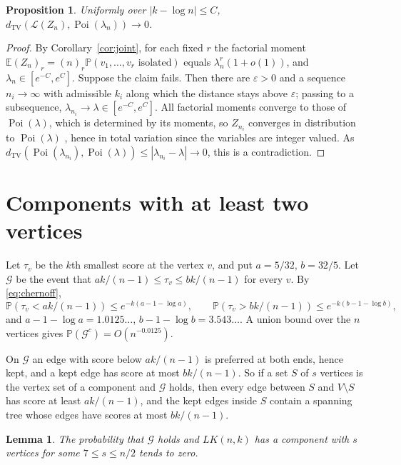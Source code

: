 \documentclass[11pt]{amsart}
\newtheorem{lemma}[theorem]{Lemma}
\newtheorem{proposition}[theorem]{Proposition}
\theoremstyle{remark}
\numberwithin{equation}{section}
\newcommand{\E}{\mathbb E}
\newcommand{\Pp}{\mathbb P}
\newcommand{\Poi}{\operatorname{Poi}}
\newcommand{\dtv}{d_{\mathrm{TV}}}
\newcommand{\1}{\mathbf 1}
\begin{document}
\begin{proposition}\label{prop:poisson}
Uniformly over $|k-\log n|\le C$, $\dtv(\mathcal L(Z_n),\Poi(\lambda_n))\to0$.
\end{proposition}

\begin{proof}
By Corollary~\ref{cor:joint}, for each fixed $r$ the factorial moment $\E(Z_n)_r=(n)_r\Pp(v_1,\dots,v_r\text{ isolated})$ equals $\lambda_n^r(1+o(1))$, and $\lambda_n\in[e^{-C},e^C]$. Suppose the claim fails. Then there are $\varepsilon>0$ and a sequence $n_i\to\infty$ with admissible $k_i$ along which the distance stays above $\varepsilon$; passing to a subsequence, $\lambda_{n_i}\to\lambda\in[e^{-C},e^C]$. All factorial moments converge to those of $\Poi(\lambda)$, which is determined by its moments, so $Z_{n_i}$ converges in distribution to $\Poi(\lambda)$ \cite[Theorem~30.2]{Bil}, hence in total variation since the variables are integer valued. As $\dtv(\Poi(\lambda_{n_i}),\Poi(\lambda))\le|\lambda_{n_i}-\lambda|\to0$, this is a contradiction.
\end{proof}

\section{Components with at least two vertices}\label{sec:comp}

Let $\tau_v$ be the $k$th smallest score at the vertex $v$, and put $a=5/32$, $b=32/5$. Let $\mathcal G$ be the event that $ak/(n-1)\le\tau_v\le bk/(n-1)$ for every $v$. By \eqref{eq:chernoff},
\[
\Pp(\tau_v<ak/(n-1))\le e^{-k(a-1-\log a)},\qquad\Pp(\tau_v>bk/(n-1))\le e^{-k(b-1-\log b)},
\]
and $a-1-\log a=1.0125\ldots$, $b-1-\log b=3.543\ldots$. A union bound over the $n$ vertices gives $\Pp(\mathcal G^c)=O(n^{-0.0125})$.

On $\mathcal G$ an edge with score below $ak/(n-1)$ is preferred at both ends, hence kept, and a kept edge has score at most $bk/(n-1)$. So if a set $S$ of $s$ vertices is the vertex set of a component and $\mathcal G$ holds, then every edge between $S$ and $V\setminus S$ has score at least $ak/(n-1)$, and the kept edges inside $S$ contain a spanning tree whose edges have scores at most $bk/(n-1)$.

\begin{lemma}\label{lem:large}
The probability that $\mathcal G$ holds and $LK(n,k)$ has a component with $s$ vertices for some $7\le s\le n/2$ tends to zero.
\end{lemma}
\end{document}

